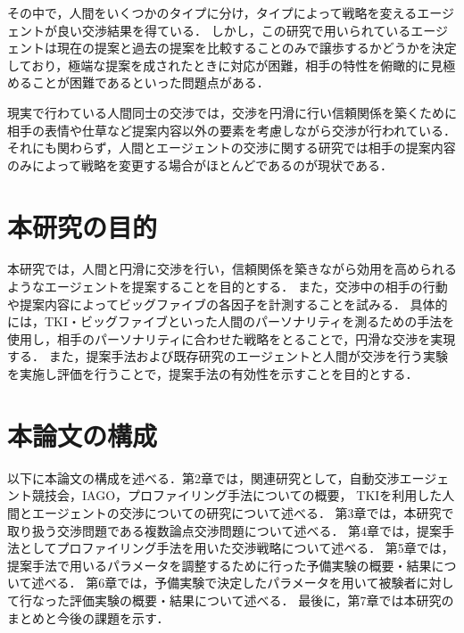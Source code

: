 
その中で，人間をいくつかのタイプに分け，タイプによって戦略を変えるエージェントが良い交渉結果を得ている\cite{tki-ha}．
しかし，この研究で用いられているエージェントは現在の提案と過去の提案を比較することのみで譲歩するかどうかを決定しており，極端な提案を成されたときに対応が困難，相手の特性を俯瞰的に見極めることが困難であるといった問題点がある．

現実で行わている人間同士の交渉では，交渉を円滑に行い信頼関係を築くために相手の表情や仕草など提案内容以外の要素を考慮しながら交渉が行われている．
それにも関わらず，人間とエージェントの交渉に関する研究では相手の提案内容のみによって戦略を変更する場合がほとんどであるのが現状である．

\section{本研究の目的}
本研究では，人間と円滑に交渉を行い，信頼関係を築きながら効用を高められるようなエージェントを提案することを目的とする．
また，交渉中の相手の行動や提案内容によってビッグファイブの各因子を計測することを試みる．
具体的には，TKI・ビッグファイブといった人間のパーソナリティを測るための手法を使用し，相手のパーソナリティに合わせた戦略をとることで，円滑な交渉を実現する．
また，提案手法および既存研究のエージェントと人間が交渉を行う実験を実施し評価を行うことで，提案手法の有効性を示すことを目的とする．

\section{本論文の構成}
以下に本論文の構成を述べる．第2章では，関連研究として，自動交渉エージェント競技会，IAGO，プロファイリング手法についての概要，
TKIを利用した人間とエージェントの交渉についての研究について述べる．
第3章では，本研究で取り扱う交渉問題である複数論点交渉問題について述べる．
第4章では，提案手法としてプロファイリング手法を用いた交渉戦略について述べる．
第5章では，提案手法で用いるパラメータを調整するために行った予備実験の概要・結果について述べる．
第6章では，予備実験で決定したパラメータを用いて被験者に対して行なった評価実験の概要・結果について述べる．
最後に，第7章では本研究のまとめと今後の課題を示す．

